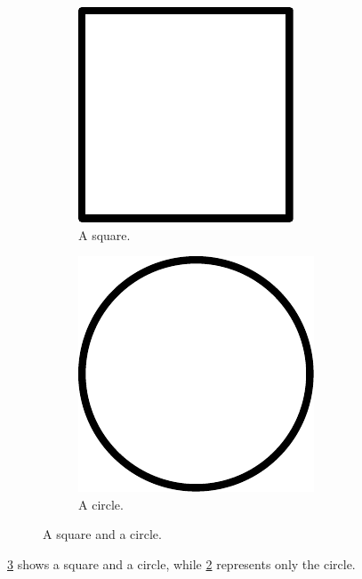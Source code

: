 \begin{figure}[ht]
  \centering
  \begin{subfigure}[t]{0.45\textwidth}
  \centering
    \includegraphics[width=0.8\linewidth]{examples/figures/square}
    \caption{A square.}\label{subfig:square}
  \end{subfigure}
  \quad
  \begin{subfigure}[t]{0.45\textwidth}
  \centering
    \includegraphics[width=0.8\linewidth]{examples/figures/circle}
    \caption{A circle.}\label{subfig:circle}
  \end{subfigure}
  \caption{A square and a circle.}\label{fig:square-circle}
\end{figure}

\cref{fig:square-circle} shows a square and a circle, while \cref{subfig:circle} represents only the circle.
